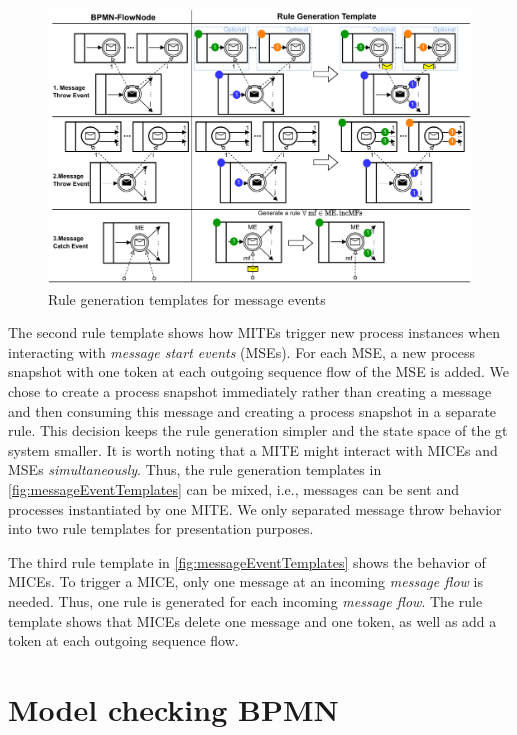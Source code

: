 \documentclass[runningheads]{llncs}
\begin{document}
\begin{figure}[ht]
    \centering
    \includegraphics[width=1\textwidth]{images/bpmn_semantics-message_templates.pdf}
    \caption{Rule generation templates for message events}
    \label{fig:messageEventTemplates}
\end{figure}

The second rule template shows how MITEs trigger new process instances when interacting with \textit{message start events} (MSEs).
For each MSE, a new process snapshot with one token at each outgoing sequence flow of the MSE is added.
We chose to create a process snapshot immediately rather than creating a message and then consuming this message and creating a process snapshot in a separate rule.
This decision keeps the rule generation simpler and the state space of the \gls*{gt} system smaller.
It is worth noting that a MITE might interact with MICEs and MSEs \textit{simultaneously}.
Thus, the rule generation templates in \autoref{fig:messageEventTemplates} can be mixed, i.e., messages can be sent and processes instantiated by one MITE.
We only separated message throw behavior into two rule templates for presentation purposes.

The third rule template in \autoref{fig:messageEventTemplates} shows the behavior of MICEs.
To trigger a MICE, only one message at an incoming \textit{message flow} is needed.
Thus, one rule is generated for each incoming \textit{message flow}.
The rule template shows that MICEs delete one message and one token, as well as add a token at each outgoing sequence flow.


\section{Model checking BPMN} \label{sec:modelChecking}
\end{document}
